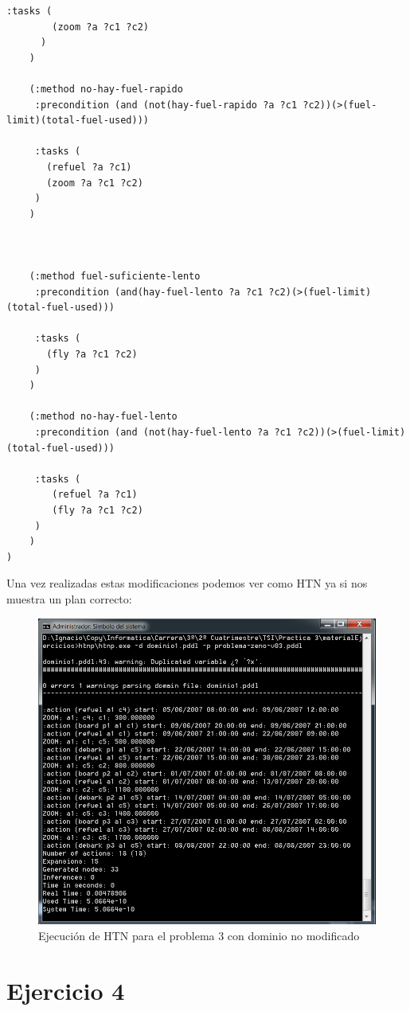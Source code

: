 \begin{itemize}
\begin{lstlisting}[language=SH]
	 :tasks (
	    (zoom ?a ?c1 ?c2)
	  )
	)
	
	(:method no-hay-fuel-rapido 
	 :precondition (and (not(hay-fuel-rapido ?a ?c1 ?c2))(>(fuel-limit)(total-fuel-used)))
	 
	 :tasks (
	   (refuel ?a ?c1)
	   (zoom ?a ?c1 ?c2)
	 )
	)
	
	
	
	(:method fuel-suficiente-lento 
	 :precondition (and(hay-fuel-lento ?a ?c1 ?c2)(>(fuel-limit)(total-fuel-used)))
	 
	 :tasks (
	   (fly ?a ?c1 ?c2)
	 )
	)
	
	(:method no-hay-fuel-lento 
	 :precondition (and (not(hay-fuel-lento ?a ?c1 ?c2))(>(fuel-limit)(total-fuel-used)))
	 
	 :tasks (
		(refuel ?a ?c1)
		(fly ?a ?c1 ?c2)
	 )
	)
)

\end{lstlisting}

Una vez realizadas estas modificaciones podemos ver como HTN ya si nos muestra un plan correcto:


\begin{figure}[H]
	\centering
	\includegraphics[width=0.8\linewidth]{p32}
	\caption{Ejecución de HTN para el problema 3 con dominio no modificado}
	\label{fig:p32}
\end{figure}
	
\end{itemize}

\newpage
\section{Ejercicio 4}

